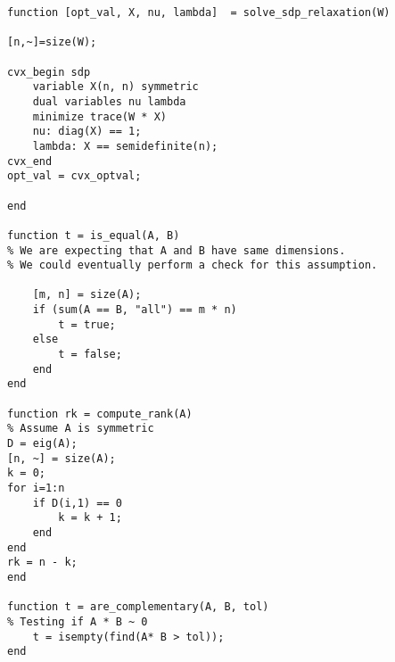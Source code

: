 \documentclass[11pt]{article}
\begin{document}
\begin{verbatim}
function [opt_val, X, nu, lambda]  = solve_sdp_relaxation(W)

[n,~]=size(W);

cvx_begin sdp
    variable X(n, n) symmetric
    dual variables nu lambda 
    minimize trace(W * X)
    nu: diag(X) == 1;
    lambda: X == semidefinite(n);
cvx_end
opt_val = cvx_optval;

end

function t = is_equal(A, B)
% We are expecting that A and B have same dimensions.
% We could eventually perform a check for this assumption.

    [m, n] = size(A);
    if (sum(A == B, "all") == m * n)
        t = true;
    else
        t = false;
    end
end

function rk = compute_rank(A)
% Assume A is symmetric
D = eig(A);
[n, ~] = size(A);
k = 0;
for i=1:n
    if D(i,1) == 0
        k = k + 1;
    end
end   
rk = n - k;
end

function t = are_complementary(A, B, tol)
% Testing if A * B ~ 0
    t = isempty(find(A* B > tol));
end

\end{verbatim}
\end{document}
